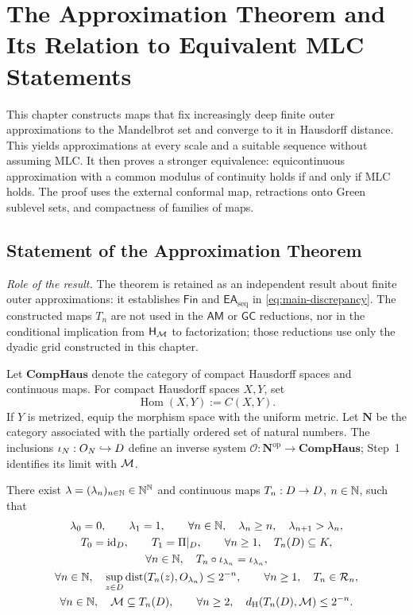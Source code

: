 \chapter{The Approximation Theorem and Its Relation to Equivalent MLC Statements}
\label{ch:approximation}
\noindent This chapter constructs maps that fix increasingly deep finite outer approximations to the Mandelbrot set and converge to it in Hausdorff distance. This yields approximations at every scale and a suitable sequence without assuming MLC. It then proves a stronger equivalence: equicontinuous approximation with a common modulus of continuity holds if and only if MLC holds. The proof uses the external conformal map, retractions onto Green sublevel sets, and compactness of families of maps.

\section{Statement of the Approximation Theorem}
\label{sec:approximation-statement}

\noindent\emph{Role of the result.} The theorem is retained as an
independent result about finite outer approximations: it establishes
\(\mathsf{Fin}\) and \(\mathsf{EA}_{\mathrm{seq}}\) in
\eqref{eq:main-discrepancy}. The constructed maps \(T_n\) are not used
in the \(\mathsf{AM}\) or \(\mathsf{GC}\) reductions, nor in the
conditional implication from \(\mathsf H_{\mathcal M}\) to factorization; those
reductions use only the dyadic grid constructed in this chapter.

Let \(\mathbf{CompHaus}\) denote the category of compact Hausdorff
spaces and continuous maps. For compact Hausdorff spaces \(X,Y\), set
\[
 \operatorname{Hom}(X,Y):=C(X,Y).
\]
If \(Y\) is metrized, equip the morphism space with the uniform metric.
Let \(\mathbf N\) be the category associated with the partially ordered
set of natural numbers. The inclusions \(\iota_N:O_N\hookrightarrow D\)
define an inverse system
\(\mathcal O:\mathbf N^{\mathrm{op}}\to\mathbf{CompHaus}\); Step~1
identifies its limit with \(\mathcal M\).

\begin{approxthm}
There exist \(\lambda=(\lambda_n)_{n\in\mathbb N}\in\mathbb N^\mathbb N\) and continuous
maps \(T_n:D\to D\), \(n\in\mathbb N\), such that
\begin{gather}
 \lambda_0=0,\qquad\lambda_1=1,\qquad
 \forall n\in\mathbb N,\quad \lambda_n\ge n,\quad
 \lambda_{n+1}>\lambda_n,\label{eq:opening-depths}\\
 T_0=\operatorname{id}_{D},\qquad T_1=\Pi|_{D},\qquad
 \forall n\ge1,\quad T_n(D)\subseteq K,\label{eq:opening-maps}\\
 \forall n\in\mathbb N,\quad
 T_n\circ\iota_{\lambda_n}=\iota_{\lambda_n},
 \label{eq:opening-fixing}\\
 \forall n\in\mathbb N,\quad
 \sup_{z\in D}\operatorname{dist}(T_n(z),O_{\lambda_n})
                 \le2^{-n},
 \qquad
 \forall n\ge1,\quad T_n\in\mathcal R_n,
 \label{eq:opening-proximity}\\
 \forall n\in\mathbb N,\quad
 \mathcal M\subseteq T_n(D),\qquad
 \forall n\ge2,\quad
 d_{\mathrm H}(T_n(D),\mathcal M)\le2^{-n}.
 \label{eq:opening-image-distance}
\end{gather}
\end{approxthm}

